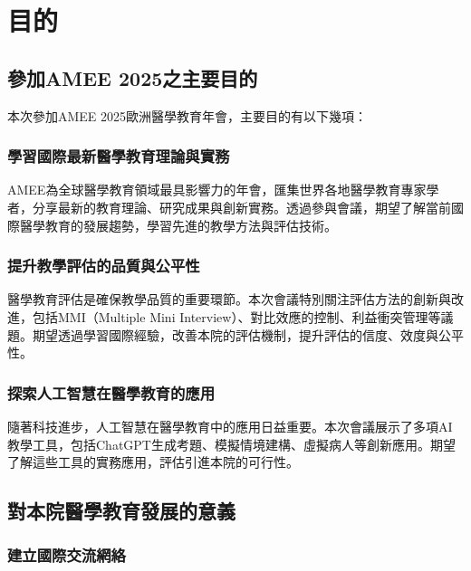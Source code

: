 \documentclass[12pt,a4paper]{article}
\begin{document}
\setcounter{tocdepth}{2}

\newpage
\tableofcontents
\newpage

\setcounter{page}{1}
\section{目的}

\subsection{參加AMEE 2025之主要目的}

本次參加AMEE 2025歐洲醫學教育年會，主要目的有以下幾項：

\subsubsection{學習國際最新醫學教育理論與實務}

AMEE為全球醫學教育領域最具影響力的年會，匯集世界各地醫學教育專家學者，分享最新的教育理論、研究成果與創新實務。透過參與會議，期望了解當前國際醫學教育的發展趨勢，學習先進的教學方法與評估技術。

\subsubsection{提升教學評估的品質與公平性}

醫學教育評估是確保教學品質的重要環節。本次會議特別關注評估方法的創新與改進，包括MMI（Multiple Mini Interview）、對比效應的控制、利益衝突管理等議題。期望透過學習國際經驗，改善本院的評估機制，提升評估的信度、效度與公平性。

\subsubsection{探索人工智慧在醫學教育的應用}

隨著科技進步，人工智慧在醫學教育中的應用日益重要。本次會議展示了多項AI教學工具，包括ChatGPT生成考題、模擬情境建構、虛擬病人等創新應用。期望了解這些工具的實務應用，評估引進本院的可行性。

\subsection{對本院醫學教育發展的意義}

\subsubsection{建立國際交流網絡}
\end{document}

